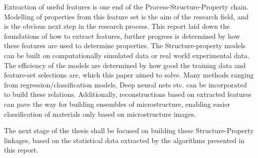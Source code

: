 \documentclass[12pt, a4paper]{report}
\begin{document}
Extraction of useful features is one end of the Process-Structure-Property chain. Modelling of properties from this feature set is the aim of the research field, and is the obvious next step in the research process. This report laid down the foundations of how to extract features, further progress is determined by how these features are used to determine properties. The Structure-property models can be built on computationally simulated data or real world experimental data. The efficiency of the models are determined by how good the training data and feature-set selections are, which this paper aimed to solve. Many methods ranging from regression/classification models, Deep neural nets etc. can be incorporated to build these relations. Additionally, reconstructions based on extracted features can pave the way for building ensembles of microstructure, enabling easier classification of materials only based on microstructure images. 

The next stage of the thesis shall be focused on building these Structure-Property linkages, based on the statistical data extracted by the algorithms presented in this report. 





\printbibliography
\end{document}
